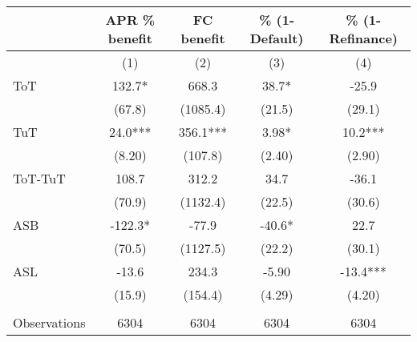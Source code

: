 \begin{tabular}{lcccc}
\toprule
      & APR \% benefit & FC benefit & \% (1-Default) & \% (1-Refinance) \\
\midrule
      & (1)   & (2)   & (3)   & (4) \\
\midrule
\midrule
ToT   & 132.7* & 668.3 & 38.7* & -25.9 \\
      & (67.8) & (1085.4) & (21.5) & (29.1) \\
TuT   & 24.0*** & 356.1*** & 3.98* & 10.2*** \\
      & (8.20) & (107.8) & (2.40) & (2.90) \\
\midrule
ToT-TuT & 108.7 & 312.2 & 34.7  & -36.1 \\
      & (70.9) & (1132.4) & (22.5) & (30.6) \\
ASB   & -122.3* & -77.9 & -40.6* & 22.7 \\
      & (70.5) & (1127.5) & (22.2) & (30.1) \\
ASL   & -13.6 & 234.3 & -5.90 & -13.4*** \\
      & (15.9) & (154.4) & (4.29) & (4.20) \\
      &       &       &       &  \\
\midrule
Observations & 6304  & 6304  & 6304  & 6304 \\
\bottomrule
\bottomrule
\end{tabular}%
